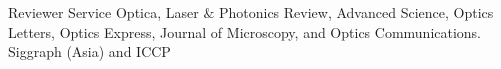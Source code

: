 \begin{rubric}{Reviewer Service}
    \entry* Optica, Laser $\&$ Photonics Review, Advanced Science, Optics Letters, Optics Express, Journal of Microscopy, and Optics Communications.
    \entry* Siggraph (Asia) and ICCP
\end{rubric}
